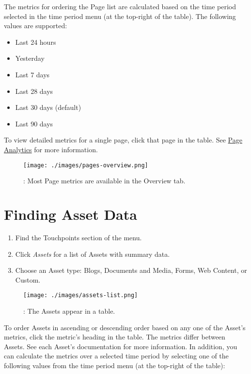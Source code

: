 The metrics for ordering the Page list are calculated based on the time
period selected in the time period menu (at the top-right of the table).
The following values are supported:

\begin{itemize}
\tightlist
\item
  Last 24 hours
\item
  Yesterday
\item
  Last 7 days
\item
  Last 28 days
\item
  Last 30 days (default)
\item
  Last 90 days
\end{itemize}

To view detailed metrics for a single page, click that page in the
table. See
\href{https://github.com/liferay/liferay-docs/blob/7.1.x/discover/analytics-cloud/articles/04-analyzing-touchpoints/01-page-analytics.markdown}{Page
Analytics} for more information.

\begin{figure}
\centering
\texttt{[image: ./images/pages-overview.png]}
\caption{: Most Page metrics are available in the Overview tab.}
\end{figure}

\section{Finding Asset Data}\label{finding-asset-data}

\begin{enumerate}
\def\labelenumi{\arabic{enumi}.}
\item
  Find the Touchpoints section of the menu.
\item
  Click \emph{Assets} for a list of Assets with summary data.
\item
  Choose an Asset type: Blogs, Documents and Media, Forms, Web Content,
  or Custom.
\end{enumerate}

\begin{figure}
\centering
\texttt{[image: ./images/assets-list.png]}
\caption{: The Assets appear in a table.}
\end{figure}

To order Assets in ascending or descending order based on any one of the
Asset's metrics, click the metric's heading in the table. The metrics
differ between Assets. See each Asset's documentation for more
information. In addition, you can calculate the metrics over a selected
time period by selecting one of the following values from the time
period menu (at the top-right of the table):

